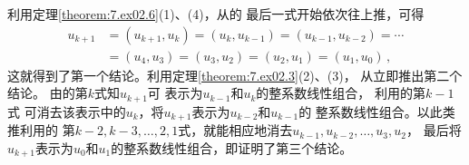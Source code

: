 \begin{prove}
    利用定理\ref{theorem:7.ex02.6}(1)、(4)，从的
    最后一式开始依次往上推，可得
    \begin{align}
        u_{k+1} & =(u_{k+1},u_k)=(u_k,u_{k-1})=(u_{k-1},u_{k-2})=\cdots\nonumber \\
                & =(u_4,u_3)=(u_3,u_2)=(u_2,u_1)=(u_1,u_0)\, ,
    \end{align}
    这就得到了第一个结论。利用定理\ref{theorem:7.ex02.3}(2)、(3)，
    从立即推出第二个结论。
    由的第$k$式知$u_{k+1}$可
    表示为$u_{k-1}$和$u_k$的整系数线性组合，
    利用的第$k-1$式
    可消去该表示中的$u_k$，将$u_{k+1}$表示为$u_{k-2}$和$u_{k-1}$的
    整系数线性组合。以此类推利用的
    第$k-2,k-3,\ldots,2,1$式，就能相应地消去$u_{k-1},u_{k-2},\ldots,u_3,u_2$，
    最后将$u_{k+1}$表示为$u_0$和$u_1$的整系数线性组合，即证明了第三个结论。
\end{prove}

